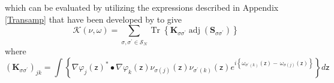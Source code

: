 \documentclass[aps,preprint]{revtex4}%
\begin{document}
which can be evaluated by utilizing the expressions described in Appendix
\ref{Transamp} that have been developed by \cite{Verbeek1990} to give
\begin{equation}
\mathcal{K}\left(  \nu,\omega\right)  =%
{\textstyle\sum\limits_{\sigma,\sigma^{\prime}\in\mathcal{S}_{N}}}
\operatorname{Tr}\left\{  \mathbf{K}_{\sigma\sigma^{\prime}}\operatorname{adj}%
\left(  \mathbf{S}_{\sigma\sigma^{\prime}}\right)  \right\}
\end{equation}
where
\begin{equation}
\left(  \mathbf{K}_{\sigma\sigma^{\prime}}\right)  _{jk}=\int\left\{
\nabla\varphi_{j}\left(  \mathsf{z}\right)  ^{\ast}\bullet\nabla\varphi
_{k}\left(  \mathsf{z}\right)  \nu_{\sigma\left(  j\right)  }\left(
\mathsf{z}\right)  \nu_{\sigma^{\prime}\left(  k\right)  }\left(
\mathsf{z}\right)  e^{i\left\{  \omega_{\sigma^{\prime}\left(  k\right)
}\left(  \mathsf{z}\right)  -\,\omega_{\sigma\left(  j\right)  }\left(
\mathsf{z}\right)  \right\}  }\right\}  d\mathsf{z}%
\end{equation}
\end{document}
